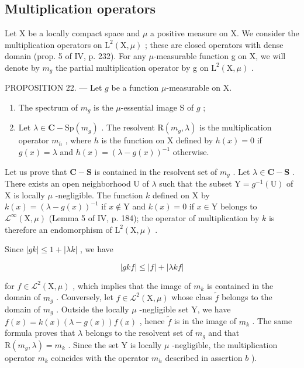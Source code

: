 \subsection{Multiplication operators}

Let X be a locally compact space and \(\mu\) a positive measure on X. We consider the multiplication operators on \(\mathrm{L}^{2}(\mathrm{X},\mu)\) ; these are closed operators with dense domain (prop. 5 of IV, p. 232). For any \(\mu\)-measurable function g on X, we will denote by \(m_{g}\) the partial multiplication operator by g on \(\mathrm{L}^{2}(\mathrm{X},\mu)\) .

PROPOSITION 22. — Let \(g\) be a function \(\mu\)-measurable on X.

\begin{enumerate}
\def\labelenumi{\alph{enumi})}
\item
  The spectrum of \(m_{g}\) is the \(\mu\)-essential image S of \(g\) ;
\item
  Let \(\lambda \in \mathbf{C} - \mathrm{Sp}(m_g)\) . The resolvent \(\mathrm{R}(m_g, \lambda)\) is the multiplication operator \(m_h\) , where \(h\) is the function on X defined by \(h(x) = 0\) if \(g(x) = \lambda\) and \(h(x) = (\lambda - g(x))^{-1}\) otherwise.
\end{enumerate}

Let us prove that \(\mathbf{C} - \mathbf{S}\) is contained in the resolvent set of \(m_g\) . Let \(\lambda \in \mathbf{C} - \mathbf{S}\) . There exists an open neighborhood U of \(\lambda\) such that the subset \(\mathrm{Y} = g^{-1}(\mathrm{U})\) of X is locally \(\mu\) -negligible. The function \(k\) defined on X by \(k(x) = (\lambda - g(x))^{-1}\) if \(x \notin \mathrm{Y}\) and \(k(x) = 0\) if \(x \in \mathrm{Y}\) belongs to \(\mathcal{L}^{\infty}(\mathrm{X}, \mu)\) (Lemma 5 of IV, p. 184); the operator of multiplication by \(k\) is therefore an endomorphism of \(\mathrm{L}^{2}(\mathrm{X}, \mu)\) .

Since \(|gk| \leqslant 1 + |\lambda k|\) , we have

\[
| g k f | \leqslant | f | + | \lambda k f |
\]

for \(f \in \mathcal{L}^2(\mathrm{X},\mu)\) , which implies that the image of \(m_k\) is contained in the domain of \(m_g\) . Conversely, let \(f \in \mathcal{L}^2(\mathrm{X},\mu)\) whose class \(\widetilde{f}\) belongs to the domain of \(m_g\) . Outside the locally \(\mu\) -negligible set Y, we have \(f(x) = k(x)(\lambda - g(x))f(x)\) , hence \(\widetilde{f}\) is in the image of \(m_k\) . The same formula proves that \(\lambda\) belongs to the resolvent set of \(m_g\) and that \(\mathrm{R}(m_g,\lambda) = m_k\) . Since the set Y is locally \(\mu\) -negligible, the multiplication operator \(m_k\) coincides with the operator \(m_h\) described in assertion \(b\) ).

